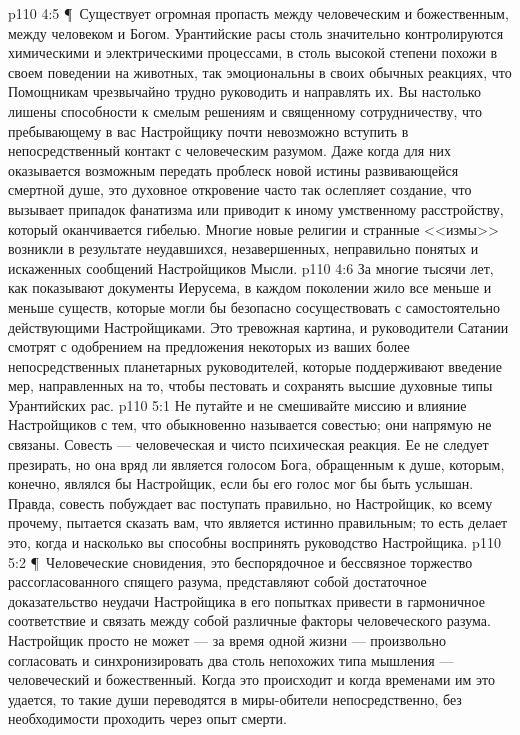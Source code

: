 \vs p110 4:5 \P\ Существует огромная пропасть между человеческим и божественным, между человеком и Богом. Урантийские расы столь значительно контролируются химическими и электрическими процессами, в столь высокой степени похожи в своем поведении на животных, так эмоциональны в своих обычных реакциях, что Помощникам чрезвычайно трудно руководить и направлять их. Вы настолько лишены способности к смелым решениям и священному сотрудничеству, что пребывающему в вас Настройщику почти невозможно вступить в непосредственный контакт с человеческим разумом. Даже когда для них оказывается возможным передать проблеск новой истины развивающейся смертной душе, это духовное откровение часто так ослепляет создание, что вызывает припадок фанатизма или приводит к иному умственному расстройству, который оканчивается гибелью. Многие новые религии и странные <<измы>> возникли в результате неудавшихся, незавершенных, неправильно понятых и искаженных сообщений Настройщиков Мысли.
\vs p110 4:6 За многие тысячи лет, как показывают документы Иерусема, в каждом поколении жило все меньше и меньше существ, которые могли бы безопасно сосуществовать с самостоятельно действующими Настройщиками. Это тревожная картина, и руководители Сатании смотрят с одобрением на предложения некоторых из ваших более непосредственных планетарных руководителей, которые поддерживают введение мер, направленных на то, чтобы пестовать и сохранять высшие духовные типы Урантийских рас.
\vs p110 5:1 Не путайте и не смешивайте миссию и влияние Настройщиков с тем, что обыкновенно называется совестью; они напрямую не связаны. Совесть --- человеческая и чисто психическая реакция. Ее не следует презирать, но она вряд ли является голосом Бога, обращенным к душе, которым, конечно, являлся бы Настройщик, если бы его голос мог бы быть услышан. Правда, совесть побуждает вас поступать правильно, но Настройщик, ко всему прочему, пытается сказать вам, что является истинно правильным; то есть делает это, когда и насколько вы способны воспринять руководство Настройщика.
\vs p110 5:2 \P\ Человеческие сновидения, это беспорядочное и бессвязное торжество рассогласованного спящего разума, представляют собой достаточное доказательство неудачи Настройщика в его попытках привести в гармоничное соответствие и связать между собой различные факторы человеческого разума. Настройщик просто не может --- за время одной жизни --- произвольно согласовать и синхронизировать два столь непохожих типа мышления --- человеческий и божественный. Когда это происходит и когда временами им это удается, то такие души переводятся в миры\hyp{}обители непосредственно, без необходимости проходить через опыт смерти.
